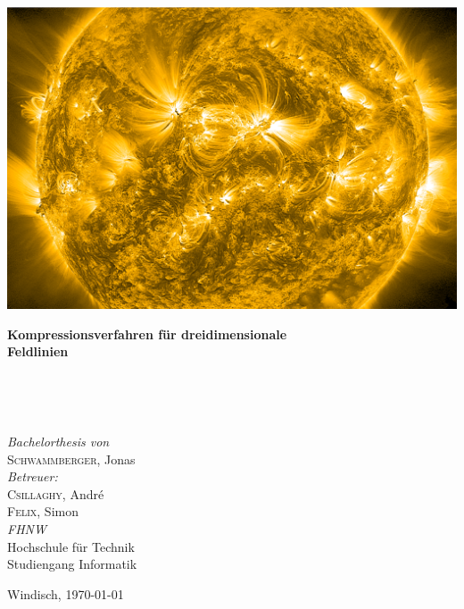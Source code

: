 
\thispagestyle{titlestyle}

\includegraphics[width=1\textwidth]{./pictures/title3.png}\\

\begin{onehalfspace}
\begin{huge}
\textbf{Kompressionsverfahren für dreidimensionale\\Feldlinien}
\end{huge}
\vspace{0.1cm}\\
\begin{Large}
\end{Large}
\vspace{0.8cm}\\
\begin{large}
\emph{Bachelorthesis von}\\
\textsc{Schwammberger}, Jonas\vspace{0.8cm}\\
\emph{Betreuer:}\\
\textsc{Csillaghy}, André\\
\textsc{Felix}, Simon\vspace{0.8cm}\\
\emph{FHNW}\\
Hochschule für Technik\\
Studiengang Informatik\vspace{0.8cm}\\
\end{large}
\end{onehalfspace}
\vfill
\begin{normalsize}
Windisch, \today
\end{normalsize}
\pagebreak
